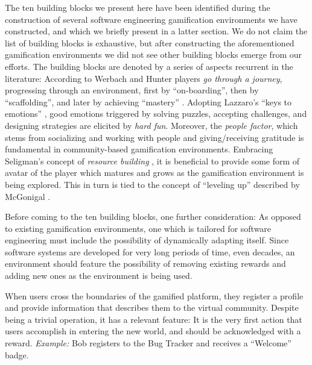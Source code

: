 The ten building blocks we present here have been identified during the construction of several software engineering gamification environments we have constructed, and which we briefly present in a latter section. We do not claim the list of building blocks is exhaustive, but after constructing the aforementioned gamification environments we did not see other building blocks emerge from our efforts. The building blocks are denoted by a series of aspects recurrent in the literature: According to Werbach and Hunter players {\em go through a journey}, progressing through an environment, first by ``on-boarding'', then by ``scaffolding'', and later by achieving ``mastery'' \cite{Werb2012a}. Adopting Lazzaro's ``keys to emotions'' \cite{Lazzaro2004}, good emotions triggered by solving puzzles, accepting challenges, and designing strategies are elicited by {\em hard fun}. Moreover, the {\em people factor}, which stems from socializing and working with people and giving/receiving gratitude is fundamental in community-based gamification environments. Embracing Seligman's concept of {\em resource building} \cite{seligman2000positive}, it is beneficial to provide some form of avatar of the player which matures and grows as the gamification environment is being explored. This in turn is tied to the concept of ``leveling up'' described by McGonigal \cite{McGo2011a}.

Before coming to the ten building blocks, one further consideration: As opposed to existing gamification environments, one which is tailored for software engineering must include the possibility of dynamically adapting itself. Since software systems are developed for very long periods of time, even decades, an environment should feature the possibility of removing existing rewards and adding new ones as the environment is being used.

 When users cross the boundaries of the gamified platform, they register a profile and provide information that describes them to the virtual community. Despite being a trivial operation, it has a relevant feature: It is the very first action that users accomplish in entering the new world, and should be acknowledged with a reward. {\em Example:} Bob registers to the Bug Tracker and receives a ``Welcome'' badge.

